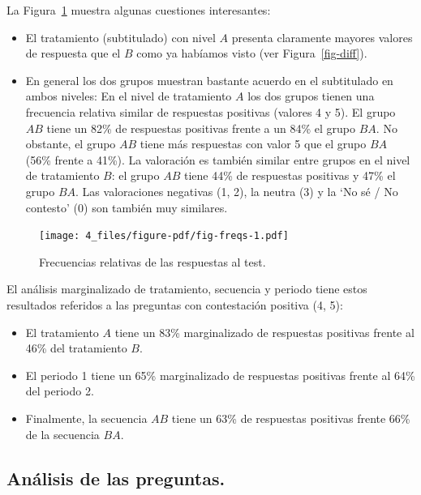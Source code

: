 \documentclass[
  12pt,
  a4paper,
  extrafontsizes,
  onecolumn,
  openright,
  table]{memoir}
\begin{document}
La Figura~\ref{fig-freqs} muestra algunas cuestiones interesantes:

\begin{itemize}
\item
  El tratamiento (subtitulado) con nivel \(A\) presenta claramente
  mayores valores de respuesta que el \(B\) como ya habíamos visto (ver
  Figura~\ref{fig-diff}).
\item
  En general los dos grupos muestran bastante acuerdo en el subtitulado
  en ambos niveles: En el nivel de tratamiento \(A\) los dos grupos
  tienen una frecuencia relativa similar de respuestas positivas
  (valores 4 y 5). El grupo \(AB\) tiene un 82\% de respuestas positivas
  frente a un 84\% el grupo \(BA\). No obstante, el grupo \(AB\) tiene
  más respuestas con valor 5 que el grupo \(BA\) (56\% frente a 41\%).
  La valoración es también similar entre grupos en el nivel de
  tratamiento \(B\): el grupo \(AB\) tiene 44\% de respuestas positivas
  y 47\% el grupo \(BA\). Las valoraciones negativas (1, 2), la neutra
  (3) y la \enquote*{No sé / No contesto} (0) son también muy similares.
\end{itemize}

\begin{figure}[h]

{\centering \texttt{[image: 4\_files/figure-pdf/fig-freqs-1.pdf]}

}

\caption{\label{fig-freqs}Frecuencias relativas de las respuestas al
test.}

\end{figure}

El análisis marginalizado de tratamiento, secuencia y periodo tiene
estos resultados referidos a las preguntas con contestación positiva (4,
5):

\begin{itemize}
\item
  El tratamiento \(A\) tiene un 83\% marginalizado de respuestas
  positivas frente al 46\% del tratamiento \(B\).
\item
  El periodo 1 tiene un 65\% marginalizado de respuestas positivas
  frente al 64\% del periodo 2.
\item
  Finalmente, la secuencia \(AB\) tiene un 63\% de respuestas positivas
  frente 66\% de la secuencia \(BA\).
\end{itemize}

\hypertarget{anuxe1lisis-de-las-preguntas.}{%
\subsection{Análisis de las
preguntas.}\label{anuxe1lisis-de-las-preguntas.}}
\end{document}
